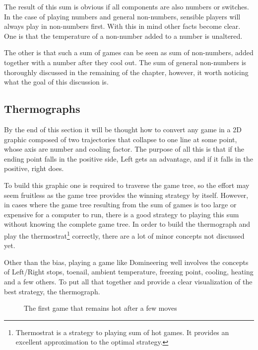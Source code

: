 The result of this sum is obvious if all components are also numbers or switches. In the case of playing numbers and general non-numbers, sensible players will always play in non-numbers first. With this in mind other facts become clear. One is that the temperature of a non-number added to a number is unaltered.

The other is that such a sum of games can be seen as sum of non-numbers, added together with a number after they cool out. The sum of general non-numbers is thoroughly discussed in the remaining of the chapter, however, it worth noticing what the goal of this discussion is.

\subsection*{Thermographs}

By the end of this section it will be thought how to convert any game in a 2D graphic composed of two trajectories that collapse to one line at some point, whose axis are number and cooling factor. The purpose of all this is that if the ending point falls in the positive side, Left gets an advantage, and if it falls in the positive, right does.

To build this graphic one is required to traverse the game tree, so the effort may seem fruitless as the game tree provides the winning strategy by itself. However, in cases where the game tree resulting from the sum of games is too large or expensive for a computer to run, there is a good strategy to playing this sum without knowing the complete game tree. In order to build the thermograph and play the thermostrat\footnote{Thermostrat is a strategy to playing sum of hot games. It provides an excellent approximation to the optimal strategy.} correctly, there are a lot of minor concepts not discussed yet.

Other than the bias, playing a game like Domineering well involves the concepts of Left/Right stops, toenail, ambient temperature, freezing point, cooling, heating and a few others. To put all that together and provide a clear visualization of the best strategy, the thermograph.

\begin{figure}[H]
\begin{center}
\end{center}
\caption{The first game that remains hot after a few moves}
\end{figure}


